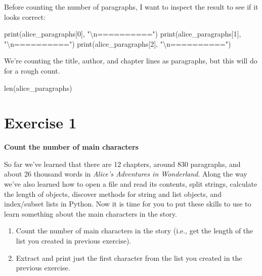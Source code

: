 \documentclass[]{book}
\newenvironment{Shaded}{\begin{snugshade}}{\end{snugshade}}
\newcommand{\BuiltInTok}[1]{#1}
\newcommand{\CharTok}[1]{\textcolor[rgb]{0.31,0.60,0.02}{#1}}
\newcommand{\DecValTok}[1]{\textcolor[rgb]{0.00,0.00,0.81}{#1}}
\newcommand{\NormalTok}[1]{#1}
\newcommand{\StringTok}[1]{\textcolor[rgb]{0.31,0.60,0.02}{#1}}
\begin{document}
Before counting the number of paragraphs, I want to inspect the result to see if it looks correct:

\begin{Shaded}
\begin{Highlighting}[]
\BuiltInTok{print}\NormalTok{(alice_paragraphs[}\DecValTok{0}\NormalTok{], }\StringTok{"}\CharTok{\textbackslash{}n}\StringTok{=========="}\NormalTok{)}
\BuiltInTok{print}\NormalTok{(alice_paragraphs[}\DecValTok{1}\NormalTok{], }\StringTok{"}\CharTok{\textbackslash{}n}\StringTok{=========="}\NormalTok{)}
\BuiltInTok{print}\NormalTok{(alice_paragraphs[}\DecValTok{2}\NormalTok{], }\StringTok{"}\CharTok{\textbackslash{}n}\StringTok{=========="}\NormalTok{)}
\end{Highlighting}
\end{Shaded}

We're counting the title, author, and chapter lines as paragraphs, but this will do for a rough count.

\begin{Shaded}
\begin{Highlighting}[]
\BuiltInTok{len}\NormalTok{(alice_paragraphs)}
\end{Highlighting}
\end{Shaded}

\hypertarget{exercise-1-4}{%
\section{Exercise 1}\label{exercise-1-4}}

\textbf{Count the number of main characters}

So far we've learned that there are 12 chapters, around 830 paragraphs, and about 26 thousand words in \emph{Alice's Adventures in Wonderland}. Along the way we've also learned how to open a file and read its contents, split strings, calculate the length of objects, discover methods for string and list objects, and index/subset lists in Python. Now it is time for you to put these skills to use to learn something about the main characters in the story.

\begin{enumerate}
\def\labelenumi{\arabic{enumi}.}
\item
  Count the number of main characters in the story (i.e., get the length of the list you created in previous exercise).
\item
  Extract and print just the first character from the list you created in the previous exercise.
\end{enumerate}
\end{document}
